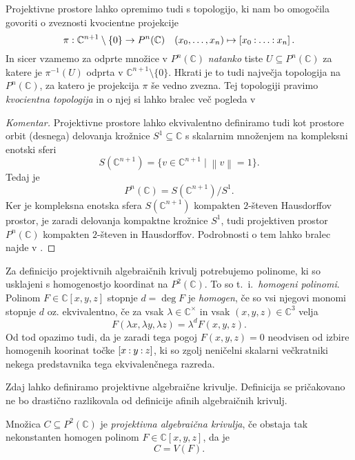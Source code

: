 \documentclass[mat1]{fmfdelo}
\newcommand{\C}{\mathbb C}
\newcommand{\CM}{\mathbb C ^\times}
\newcommand{\PC}{P^2(\mathbb C)}
\newcommand{\inv}{^{-1}}
\newcommand{\pcoor}[1]{%
\begingroup\lccode`~=`: \lowercase{\endgroup
\edef~}{\mathbin{\mathchar\the\mathcode`:}\nobreak}%
\left[%
\begingroup
\mathcode`:=\string"8000
#1%
\endgroup
\right]%
}
\theoremstyle{definition}
\newenvironment{komentar}[1][Komentar]{\begin{proof}[#1]\let\qed\relax}{\end{proof}}
\begin{document}
\begin{opomba} 
    \label{topologija na projektivnih prostorih}   
    Projektivne prostore lahko opremimo tudi s topologijo, ki nam bo omogočila govoriti o zveznosti kvocientne projekcije
    \[
        \pi : \C^{n+1}\setminus\{0\} \to P^n(\C) \quad (x_0, \ldots, x_n) \mapsto \pcoor{x_0 : \ldots : x_n}. 
    \]
    In sicer vzamemo za odprte množice v $P^n(\C)$ \emph{natanko} tiste $U \subseteq P^n(\C)$ za katere je $\pi\inv(U)$ odprta v $\C^{n+1}\setminus\{0\}$. Hkrati je to tudi največja topologija na $P^n(\C)$, za katero je projekcija $\pi$ še vedno zvezna.  
    Tej topologiji pravimo \emph{kvocientna topologija} in o njej si lahko bralec več pogleda v \cite[poglavje 3.2.]{MrcunTop}
\end{opomba}

\begin{komentar}
    Projektivne prostore lahko ekvivalentno definiramo tudi kot prostore orbit (desnega) delovanja krožnice $S^1 \subseteq \C$ s skalarnim množenjem na kompleksni enotski sferi 
    \[
        S(\C^{n+1}) = \{v \in \C^{n+1} \mid \left\lVert v\right\rVert = 1\}.
    \]
    Tedaj je
    \[
        P^n(\C) = S(\C^{n+1})/S^1.
    \]
    Ker je kompleksna enotska sfera $S(\C^{n+1})$ kompakten $2$-števen Hausdorffov prostor, je zaradi delovanja kompaktne krožnice $S^1$, tudi projektiven prostor $P^n(\C)$ kompakten $2$-števen in Hausdorffov. Podrobnosti o tem lahko bralec najde v 
    \cite[Zgled 3.43. (2)]{MrcunTop}.
\end{komentar}

Za definicijo projektivnih algebraičnih krivulj potrebujemo  polinome, ki so usklajeni s homogenostjo koordinat na $\PC$. To so t.~i.\ \emph{homogeni polinomi}. Polinom $F \in \C[x,y,z]$ stopnje $d = \deg F$ je \emph{homogen}, če so vsi njegovi monomi stopnje $d$ oz. ekvivalentno, če za vsak $\lambda \in \CM$ in vsak $(x,y,z) \in \C^3$ velja
\[
    F(\lambda x, \lambda y, \lambda z) = \lambda^d F(x,y,z). 
\]
Od tod opazimo tudi, da je zaradi tega pogoj $F(x,y,z) = 0$ neodvisen od izbire homogenih koorinat točke $\pcoor{x : y : z}$, ki so zgolj neničelni skalarni večkratniki nekega predstavnika tega ekvivalenčnega razreda.  

Zdaj lahko definiramo projektivne algebraične krivulje. Definicija se pričakovano ne bo drastično razlikovala od definicije afinih algebraičnih krivulj.

\begin{definicija}
    Množica $C \subseteq \PC$ je \emph{projektivna algebraična krivulja}, če obstaja tak nekonstanten homogen polinom $F \in \C[x,y,z]$, da je
    \[
        C = V(F). 
    \]
\end{definicija}
\end{document}
